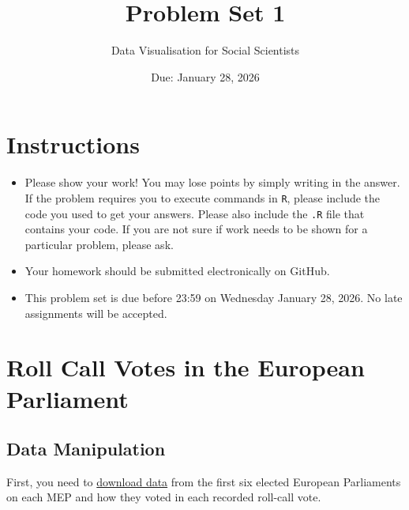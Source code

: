 \documentclass[12pt,letterpaper]{article}
\title{Problem Set 1}
\date{Due: January 28, 2026}
\author{Data Visualisation for Social Scientists}
\begin{document}
	\maketitle
	
	\section*{Instructions}
	\begin{itemize}
	\item Please show your work! You may lose points by simply writing in the answer. If the problem requires you to execute commands in \texttt{R}, please include the code you used to get your answers. Please also include the \texttt{.R} file that contains your code. If you are not sure if work needs to be shown for a particular problem, please ask.
\item Your homework should be submitted electronically on GitHub.
\item This problem set is due before 23:59 on Wednesday January 28, 2026. No late assignments will be accepted.
	\end{itemize}
	
	\vspace{1cm}
	\section*{Roll Call Votes in the European Parliament}

\subsection*{Data Manipulation}
First, you need to \href{https://personal.lse.ac.uk/hix/HixNouryRolandEPdata.HTM}{download data} from the first six elected European Parliaments on each MEP and how they voted in each recorded roll-call vote.

\vspace{.25cm}
\end{document}
